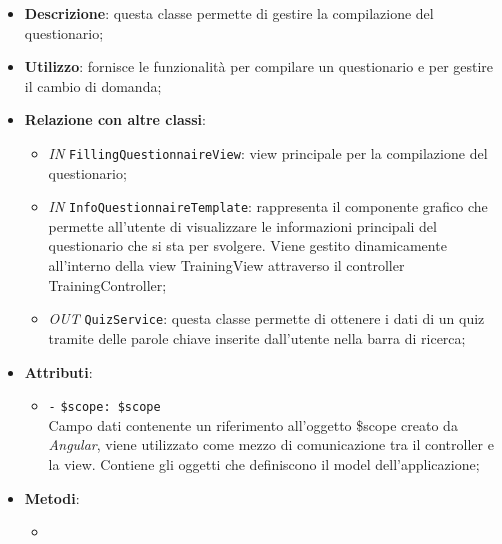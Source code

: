 \begin{itemize}
	\item \textbf{Descrizione}: questa classe permette di gestire la compilazione del questionario;
	\item \textbf{Utilizzo}: fornisce le funzionalità per compilare un questionario e per gestire il cambio di domanda;
	\item \textbf{Relazione con altre classi}:
	\begin{itemize}
		\item \textit{IN} \texttt{FillingQuestionnaireView}: view principale per la compilazione del questionario;  
		\item \textit{IN} \texttt{InfoQuestionnaireTemplate}: rappresenta il componente grafico che permette all'utente di visualizzare le informazioni principali del questionario che si sta per svolgere. Viene gestito dinamicamente all'interno della view TrainingView attraverso il controller TrainingController;
		\item \textit{OUT} \texttt{QuizService}: questa classe permette di ottenere i dati di un quiz tramite delle parole chiave inserite dall'utente nella barra di ricerca;
	\end{itemize}
	\item \textbf{Attributi}:
	\begin{itemize}
		\item \texttt{-} \texttt{\$scope: \$scope} \\
		Campo dati contenente un riferimento all’oggetto \$scope creato da \textit{Angular}, viene utilizzato come mezzo di comunicazione tra il controller e la view. Contiene gli oggetti che definiscono il model dell’applicazione;
	\end{itemize}
	\item \textbf{Metodi}:
	\begin{itemize}
		\item 
	\end{itemize}
\end{itemize}

